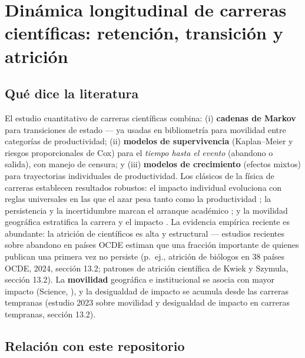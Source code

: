 \section{Dinámica longitudinal de carreras científicas: retención, transición y atrición}

\subsection{Qué dice la literatura}

El estudio cuantitativo de carreras científicas combina: (i) \textbf{cadenas de
Markov} para transiciones de estado \citep{kemeny1976finite} — ya usadas en
bibliometría para movilidad entre categorías de productividad; (ii)
\textbf{modelos de supervivencia} (Kaplan--Meier y riesgos proporcionales de
Cox) para el \emph{tiempo hasta el evento} (abandono o salida), con manejo de
censura; y (iii) \textbf{modelos de crecimiento} (efectos mixtos) para
trayectorias individuales de productividad. Los clásicos de la física de
carreras establecen resultados robustos: el impacto individual evoluciona con
reglas universales en las que el azar pesa tanto como la productividad
\citep{sinatra2016quantifying}; la persistencia y la incertidumbre marcan el
arranque académico \citep{petersen2012persistence}; y la movilidad geográfica
estratifica la carrera y el impacto \citep{deville2014career}. La evidencia
empírica reciente es abundante: la atrición de científicos es alta y
estructural — estudios recientes sobre abandono en países OCDE estiman que una
fracción importante de quienes publican una primera vez no persiste (p.~ej.,
atrición de biólogos en 38 países OCDE, 2024, sección 13.2; patrones de
atrición científica de Kwiek y Szymula, sección 13.2). La \textbf{movilidad}
geográfica e institucional se asocia con mayor impacto (Science,
\citet{sugimoto2017scientists}), y la
desigualdad de impacto se acumula desde las carreras tempranas
(estudio 2023 sobre movilidad y desigualdad de impacto en carreras tempranas,
sección 13.2).

\subsection{Relación con este repositorio}

